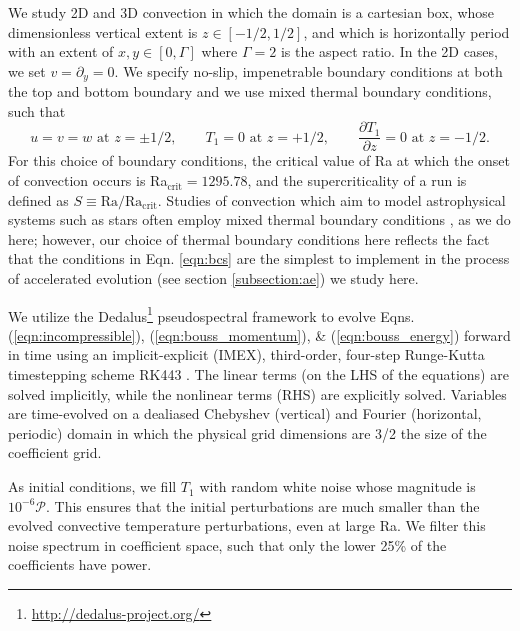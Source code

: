 \documentclass[aps, pre, onecolumn, nofootinbib, notitlepage, groupedaddress, amsfonts, amssymb, amsmath, longbibliography]{revtex4-1}
\begin{document}
We study 2D and 3D convection in which the domain is a cartesian box, 
whose dimensionless vertical extent is $z \in [-1/2, 1/2]$, 
and which is horizontally period with an extent of $x, y \in [0, \Gamma]$ where $\Gamma = 2$ is the aspect
ratio. 
In the 2D cases, we set $v = \partial_y = 0$.
We specify no-slip, impenetrable boundary conditions at both the top and
bottom boundary and we use mixed thermal boundary conditions, such that
\begin{equation}
u = v = w \, \, \text{at}\,\,z = \pm 1/2, \qquad T_1 = 0 \,\,\text{at}\,\, z=+1/2, \qquad
\frac{\partial T_1}{\partial z} = 0\,\,\text{at}\,\,z=-1/2.
\label{eqn:bcs}
\end{equation}
For this choice of boundary conditions, the critical value of Ra at which
the onset of convection occurs is Ra$_{\text{crit}} = 1295.78$, and the
supercriticality of a run is defined as $S \equiv \text{Ra}/\text{Ra}_{\text{crit}}$.
Studies of convection which aim to model
astrophysical systems such as stars often employ mixed thermal
boundary conditions \cite{hurlburt&all1984, cattaneo&all1991, korre&all2017},
as we do here; however, our choice of thermal boundary conditions here
reflects the fact that the conditions in Eqn. \ref{eqn:bcs} are the simplest
to implement in the process of accelerated evolution (see section \ref{subsection:ae})
we study here.

We utilize the 
Dedalus\footnote{\url{http://dedalus-project.org/}} 
pseudospectral framework \cite{burns&all2016} to evolve  
Eqns. (\ref{eqn:incompressible}), (\ref{eqn:bouss_momentum}), \& (\ref{eqn:bouss_energy}) 
forward in time
using an implicit-explicit (IMEX), third-order, four-step 
Runge-Kutta timestepping scheme RK443 \cite{ascher&all1997}.  
The linear terms (on the LHS of the equations) are solved implicitly,
while the nonlinear terms (RHS) are explicitly solved.
Variables are time-evolved on a dealiased Chebyshev (vertical)
and Fourier (horizontal, periodic) domain in which the
physical grid dimensions are 3/2 the size of the coefficient grid.  

As initial conditions, we fill $T_1$ with
random white noise whose magnitude is $10^{-6}\mathcal{P}$.
This ensures that the initial perturbations are much smaller than the
evolved convective temperature perturbations, even at large Ra.
We filter this noise spectrum in coefficient space, 
such that only the lower 25\% of the coefficients
have power.
\end{document}
